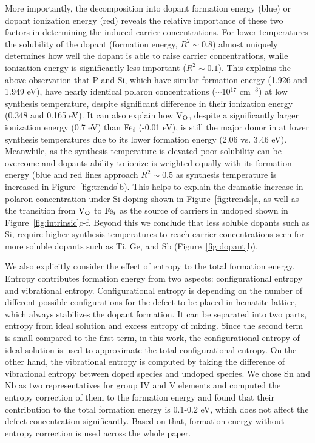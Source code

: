 More importantly, the decomposition into dopant formation energy (blue) or dopant ionization energy (red) reveals the relative importance of these two factors in determining the induced carrier concentrations.
 For lower temperatures the solubility of the dopant (formation energy, $R^2 \sim 0.8$) almost uniquely determines how well the dopant is able to raise carrier concentrations, while ionization energy is significantly less important ($R^2 \sim 0.1$).
 This explains the above observation that P and Si, which have similar formation energy (1.926 and 1.949 eV), have nearly identical polaron concentrations ($\sim$10$^{17}$ cm$^{-3}$) at low synthesis temperature, despite significant difference in their ionization energy (0.348 and 0.165 eV).
 It can also explain how $\text{V}_\text{O}$, despite a significantly larger ionization energy (0.7 eV) than $\text{Fe}_i$ (-0.01 eV), is still the major donor in  at lower synthesis temperatures due to its lower formation energy (2.06 vs. 3.46 eV).
 Meanwhile, as the synthesis temperature is elevated poor solubility can be overcome and dopants ability to ionize is weighted equally with its formation energy (blue and red lines approach $R^2 \sim 0.5$ as synthesis temperature is increased in Figure~\ref{fig:trends}b).
 This helps to explain the dramatic increase in polaron concentration under Si doping shown in Figure~\ref{fig:trends}a, as well as the transition from $\text{V}_\text{O}$ to $\text{Fe}_i$ as the source of carriers in undoped  shown in Figure~\ref{fig:intrinsic}c-f.
 Beyond this we conclude that less soluble dopants such as Si, require higher synthesis temperatures to reach carrier concentrations seen for more soluble dopants such as Ti, Ge, and Sb (Figure~\ref{fig:dopant}b).

 We also explicitly consider the effect of entropy to the total formation energy. Entropy contributes formation energy from two aspects: configurational entropy and vibrational entropy. Configurational entropy is depending on the number of different possible configurations for the defect to be placed in hematite lattice, which always stabilizes the dopant formation. It can be separated into two parts, entropy from ideal solution and excess entropy of mixing. Since the second term is small compared to the first term,\cite{ye2015generalized, ye2016high} in this work, the configurational entropy of ideal solution is used to approximate the total configurational entropy. On the other hand, the vibrational entropy is computed by taking the difference of vibrational entropy between doped species and undoped species. We chose Sn and Nb as two representatives for group IV and V elements and computed the entropy correction of them to the formation energy and found that their contribution to the total formation energy is 0.1-0.2 eV, which does not affect the defect concentration significantly. Based on that, formation energy without entropy correction is used across the whole paper.

